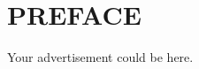 \newpage
 
\chapter*{PREFACE}
\noindent 

Your advertisement could be here.
 
\newpage
\tableofcontents

%  
%  
%  
 
 
\newpage
\renewcommand{\chaptermark}[1]{\markboth{\thechapter. \ #1}{}}
\renewcommand{\sectionmark}[1]{\markright{}{}}
\lhead{\fancyplain{}{\leftmark}}
 
